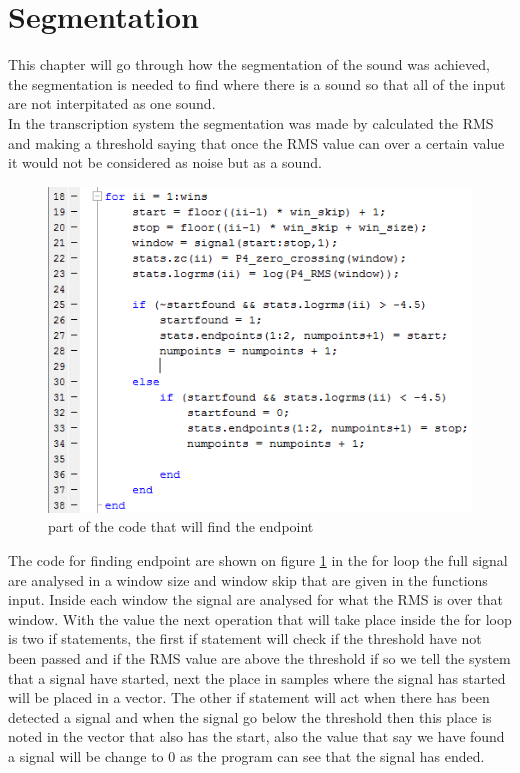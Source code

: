 \section{Segmentation}
This chapter will go through how the segmentation of the sound was achieved, the segmentation is needed to find where there is a sound so that all of the input are not interpitated as one sound.\\
In the transcription system the segmentation was made by calculated the RMS and making a threshold saying that once the RMS value can over a certain value it would not be considered as noise but as a sound. \\
\begin{figure}[h]
	\begin{center}
		\includegraphics[scale =  0.8]{fig/Find_Endpoint_script.png}
		\caption{part of the code that will find the endpoint}
		\label{P4_Findendpoints}
	\end{center}
\end{figure}
The code for finding endpoint are shown on figure \ref{P4_Findendpoints} in the for loop the full signal are analysed in a window size and window skip that are given in the functions input. Inside each window the signal are analysed for what the RMS is over that window. With the value the next operation that will take place inside the for loop is two if statements, the first if statement will check if the threshold have not been passed and if the RMS value are above the threshold if so we tell the system that a signal have started, next the place in samples where the signal has started will be placed in a vector. The other if statement will act when there has been detected a signal and when the signal go below the threshold then this place is noted in the vector that also has the start, also the value that say we have found a signal will be change to 0 as the program can see that the signal has ended.\\
